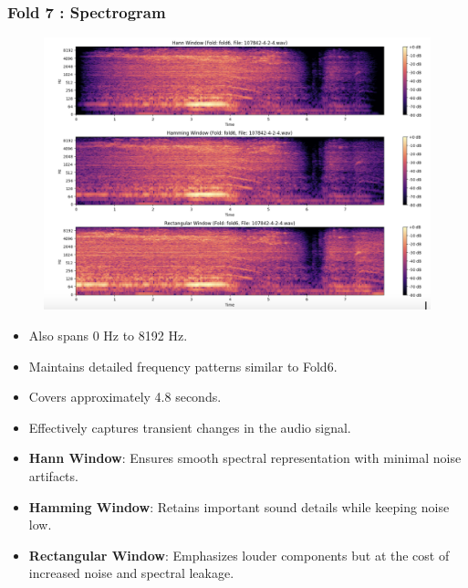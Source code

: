 \documentclass[a4paper,12pt]{article}
\begin{document}
    \subsubsection{Fold 7 : Spectrogram}
    \begin{figure}[H]
        \centering
        \includegraphics[width=1\linewidth]{Fold7.png}
    \end{figure}
    \begin{itemize}
        \item Also spans 0 Hz to 8192 Hz.
        \item Maintains detailed frequency patterns similar to Fold6.
        \item Covers approximately 4.8 seconds.
        \item Effectively captures transient changes in the audio signal.
        \item \textbf{Hann Window}:  Ensures smooth spectral representation with minimal noise artifacts.
        \item \textbf{Hamming Window}: Retains important sound details while keeping noise low.
        \item \textbf{Rectangular Window}: Emphasizes louder components but at the cost of increased noise and spectral leakage.
    \end{itemize}
\newpage
\end{document}
